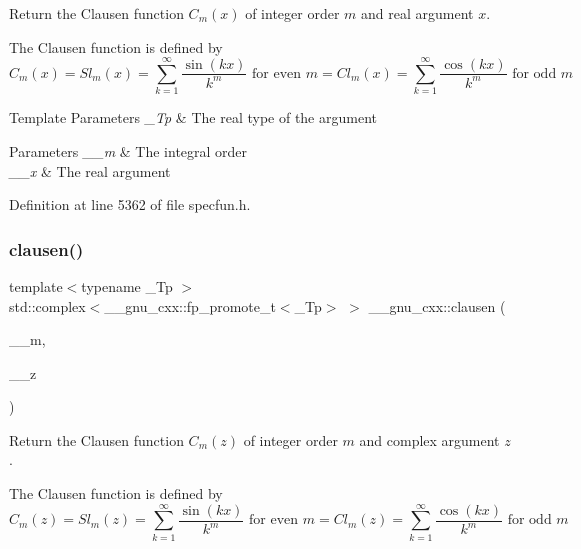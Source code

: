 Return the Clausen function $ C_m(x) $ of integer order $ m $ and real argument $ x $.

The Clausen function is defined by \[ C_m(x) = Sl_m(x) = \sum_{k=1}^\infty\frac{\sin(kx)}{k^m} \mbox{ for even } m = Cl_m(x) = \sum_{k=1}^\infty\frac{\cos(kx)}{k^m} \mbox{ for odd } m \]


\begin{DoxyTemplParams}{Template Parameters}
{\em \+\_\+\+Tp} & The real type of the argument \\
\hline
\end{DoxyTemplParams}

\begin{DoxyParams}{Parameters}
{\em \+\_\+\+\_\+m} & The integral order \\
\hline
{\em \+\_\+\+\_\+x} & The real argument \\
\hline
\end{DoxyParams}


Definition at line 5362 of file specfun.\+h.

\mbox{\label{group__gnu__math__spec__func_gaf7c4317ef6bfd3a4bf0ddcba22ee7588}} 
\subsubsection{\texorpdfstring{clausen()}{clausen()}\hspace{0.1cm}{\footnotesize\ttfamily [2/2]}}
{\footnotesize\ttfamily template$<$typename \+\_\+\+Tp $>$ \\
std\+::complex$<$\+\_\+\+\_\+gnu\+\_\+cxx\+::fp\+\_\+promote\+\_\+t$<$\+\_\+\+Tp$>$ $>$ \+\_\+\+\_\+gnu\+\_\+cxx\+::clausen (\begin{DoxyParamCaption}\item[{unsigned int}]{\+\_\+\+\_\+m,  }\item[{std\+::complex$<$ \+\_\+\+Tp $>$}]{\+\_\+\+\_\+z }\end{DoxyParamCaption})\hspace{0.3cm}{\ttfamily [inline]}}

Return the Clausen function $ C_m(z) $ of integer order $ m $ and complex argument $ z $.

The Clausen function is defined by \[ C_m(z) = Sl_m(z) = \sum_{k=1}^\infty\frac{\sin(kx)}{k^m} \mbox{ for even } m = Cl_m(z) = \sum_{k=1}^\infty\frac{\cos(kx)}{k^m} \mbox{ for odd } m \]


